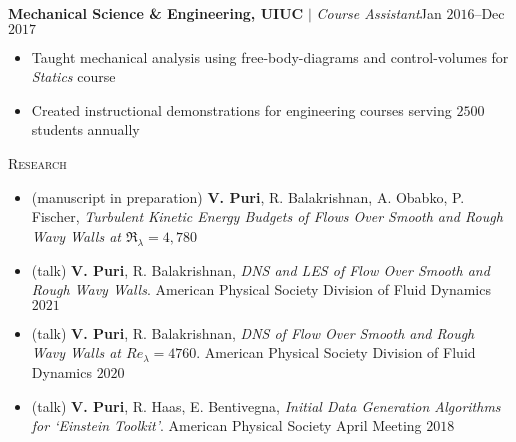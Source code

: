 \documentclass[10pt]{article}
\begin{document}
\begin{multicols}{2}
\vspace{0.5em}
%
\textbf{Mechanical Science \& Engineering, UIUC} $|$ \textit{Course Assistant}\hfill Jan $2016$--Dec $2017$

\vspace{-1.75em}
\begin{itemize}[label=-,leftmargin=1.0em]
    \setlength\itemsep{-0.25em}
    \item Taught mechanical analysis using free-body-diagrams and control-volumes for \textit{Statics} course
    \item Created instructional demonstrations for engineering courses serving $2500$ students annually
\end{itemize}
\vspace{-2.0em}

\end{multicols}
\vspace{-1.5em}
\begin{multicols}{2}
\textsc{Research}
\columnbreak

\vspace{-1.75em}
\begin{itemize}[label= ,leftmargin= 1.0em]
    \setlength{\itemindent}{-1.0em}
    \setlength\itemsep{-0.25em}
    \item (manuscript in preparation) \textbf{V. Puri}, R. Balakrishnan, A. Obabko, P. Fischer, \textit{Turbulent Kinetic Energy Budgets of Flows Over Smooth and Rough Wavy Walls at $\Re_\lambda=4,780$}
    \item (talk) \textbf{V. Puri}, R. Balakrishnan, \textit{DNS and LES of Flow Over Smooth and Rough Wavy Walls}. American Physical Society Division of Fluid Dynamics $2021$
    \item (talk) \textbf{V. Puri}, R. Balakrishnan, \textit{DNS of Flow Over Smooth and Rough Wavy Walls at $\mathit{Re}_\lambda=4760$}. American Physical Society Division of Fluid Dynamics $2020$
    \item (talk) \textbf{V. Puri}, R. Haas, E. Bentivegna, \textit{Initial Data Generation Algorithms for `Einstein Toolkit'}. American Physical Society April Meeting $2018$
\end{itemize}
\vspace{-2.0em}

\end{multicols}
\end{document}

